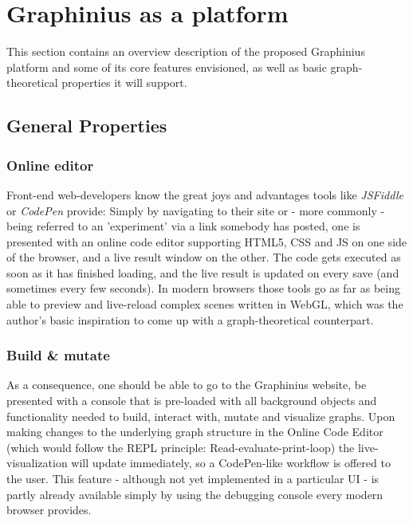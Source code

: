 \chapter{Graphinius as a platform}
\label{ch:graphinius_platform}

This section contains an overview description of the proposed Graphinius platform and some of its core features envisioned, as well as basic graph-theoretical properties it will support.


\section{General Properties}
\label{sect:general_properties}
	
	\subsection{Online editor}
	\label{ssect:online_editor}
	
		Front-end web-developers know the great joys and advantages tools like \textit{JSFiddle} or \textit{CodePen} provide: Simply by navigating to their site or - more commonly - being referred to an 'experiment' via a link somebody has posted, one is presented with an online code editor supporting HTML5, CSS and JS on one side of the browser, and a live result window on the other. The code gets executed as soon as it has finished loading, and the live result is updated on every save (and sometimes every few seconds). In modern browsers those tools go as far as being able to preview and live-reload complex scenes written in WebGL, which was the author's basic inspiration to come up with a graph-theoretical counterpart.
	
	\subsection{Build \& mutate}
	\label{ssect: build_edit}
	
	As a consequence, one should be able to go to the Graphinius website, be presented with a console that is pre-loaded with all background objects and functionality needed to build, interact with, mutate and visualize graphs. Upon making changes to the underlying graph structure in the Online Code Editor (which would follow the REPL principle: Read-evaluate-print-loop) the live-visualization will update immediately, so a CodePen-like workflow is offered to the user. This feature - although not yet implemented in a particular UI - is partly already available simply by using the debugging console every modern browser provides.
		
